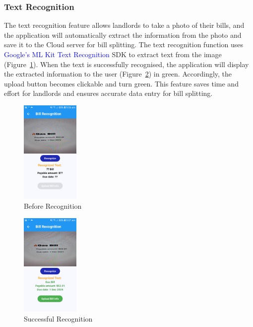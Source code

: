 \documentclass[sigconf,nonacm]{acmart}\settopmatter{printfolios=true}
\newcommand{\specialterm}[1]{\textcolor{blue}{#1}}
\begin{document}
\subsubsection{\textbf{Text Recognition}}
The text recognition feature allows landlords to take a photo of their bills, and the application will automatically extract the information from the photo and save it to the Cloud server for bill splitting. The text recognition function uses \specialterm{Google's ML Kit Text Recognition} SDK to extract text from the image (Figure~\ref{fig:beforeBillRecognition}). When the text is successfully recognised, the application will display the extracted information to the user (Figure~\ref{fig:billRecognitionDone}) in green. Accordingly, the upload button becomes clickable and turn green. This feature saves time and effort for landlords and ensures accurate data entry for bill splitting.

\begin{figure}[htbp]
  \centering
  \includegraphics[width=0.25\textwidth]{beforeBillRecognition.jpg}
  \caption{Before Recognition}
  \label{fig:beforeBillRecognition}
\end{figure}
\begin{figure}[htbp]
  \centering
  \includegraphics[width=0.25\textwidth]{billRecognitionDone.jpg}
  \caption{Successful Recognition}
  \label{fig:billRecognitionDone}
\end{figure}
\end{document}
